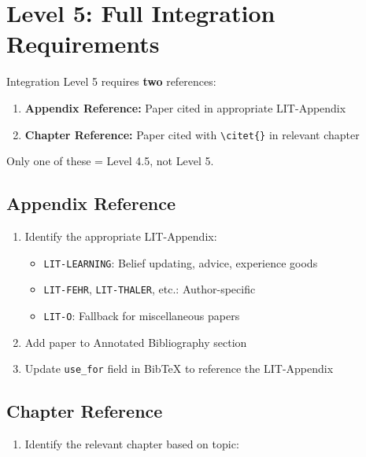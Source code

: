 \section{Level 5: Full Integration Requirements}
\label{sec:paperint-level5}

\begin{tcolorbox}[colback=red!5!white, colframe=red!75!black,
    title=Critical: Level 5 Requires BOTH Appendix AND Chapter]
Integration Level 5 requires \textbf{two} references:
\begin{enumerate}
    \item \textbf{Appendix Reference:} Paper cited in appropriate LIT-Appendix
    \item \textbf{Chapter Reference:} Paper cited with \texttt{\textbackslash citet\{\}} in relevant chapter
\end{enumerate}
Only one of these = Level 4.5, not Level 5.
\end{tcolorbox}

\subsection{Appendix Reference}

\begin{enumerate}
    \item Identify the appropriate LIT-Appendix:
    \begin{itemize}
        \item \texttt{LIT-LEARNING}: Belief updating, advice, experience goods
        \item \texttt{LIT-FEHR}, \texttt{LIT-THALER}, etc.: Author-specific
        \item \texttt{LIT-O}: Fallback for miscellaneous papers
    \end{itemize}
    \item Add paper to Annotated Bibliography section
    \item Update \texttt{use\_for} field in BibTeX to reference the LIT-Appendix
\end{enumerate}

\subsection{Chapter Reference}

\begin{enumerate}
    \item Identify the relevant chapter based on topic:
\end{enumerate}

